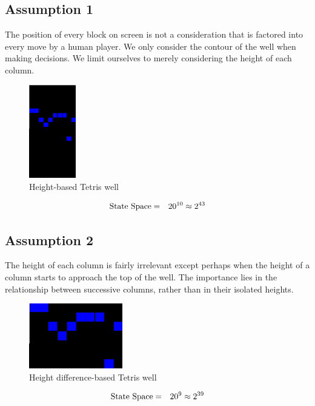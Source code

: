 \documentclass{rucsthesis}
\begin{document}
\subsection*{Assumption 1}

The position of every block on screen is not a consideration that is factored into every move by a human player. We only consider the contour of the well when making decisions. We limit ourselves to merely considering the height of each column.

\begin{figure}[h]
\centering
\includegraphics[width=0.8in]{heightwell.png}
\caption{Height-based Tetris well}
\label{fig:heightwell}
\end{figure}

\begin{eqnarray*}
\centering
\textrm{State Space} & = & 20^{10} \approx 2^{43}
\end{eqnarray*}

\subsection*{Assumption 2}

The height of each column is fairly irrelevant except perhaps when the height of a column starts to approach the top of the well. The importance lies in the relationship between successive columns, rather than in their isolated heights.

\begin{figure}[h]
\centering
\includegraphics[width=1.6in]{diffheightwell.png}
\caption{Height difference-based Tetris well}
\label{fig:diffheightwell}
\end{figure}

\begin{eqnarray*}
\centering
\textrm{State Space} & = & 20^{9} \approx 2^{39}
\end{eqnarray*}
\end{document}
